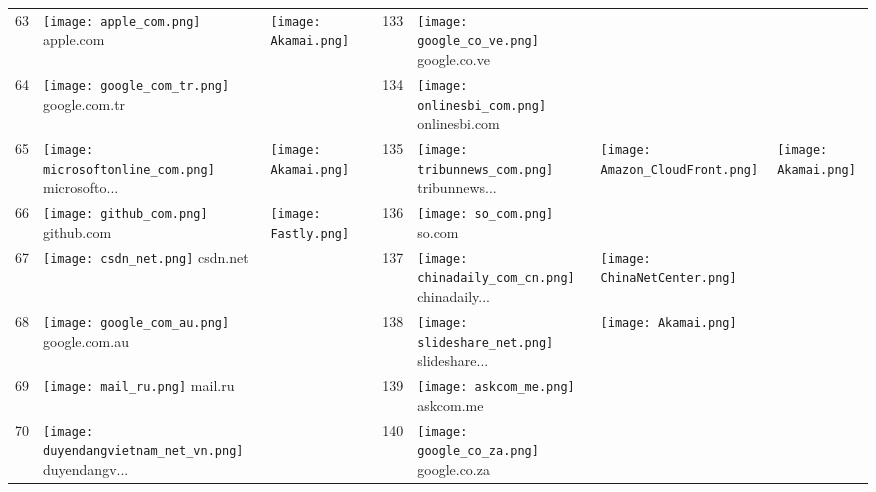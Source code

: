 \begin{table}[]
\begin{tabular}{|llll|llll|}
63 & \texttt{[image: apple\_com.png]} apple.com & \texttt{[image: Akamai.png]} & & 133 & \texttt{[image: google\_co\_ve.png]} google.co.ve & & \\
64 & \texttt{[image: google\_com\_tr.png]} google.com.tr & & & 134 & \texttt{[image: onlinesbi\_com.png]} onlinesbi.com & & \\
65 & \texttt{[image: microsoftonline\_com.png]} microsofto... & \texttt{[image: Akamai.png]} & & 135 & \texttt{[image: tribunnews\_com.png]} tribunnews... & \texttt{[image: Amazon\_CloudFront.png]} & \texttt{[image: Akamai.png]} \\
66 & \texttt{[image: github\_com.png]} github.com & \texttt{[image: Fastly.png]} & & 136 & \texttt{[image: so\_com.png]} so.com & & \\
67 & \texttt{[image: csdn\_net.png]} csdn.net & & & 137 & \texttt{[image: chinadaily\_com\_cn.png]} chinadaily... & \texttt{[image: ChinaNetCenter.png]} & \\
68 & \texttt{[image: google\_com\_au.png]} google.com.au & & & 138 & \texttt{[image: slideshare\_net.png]} slideshare... & \texttt{[image: Akamai.png]} & \\
69 & \texttt{[image: mail\_ru.png]} mail.ru & & & 139 & \texttt{[image: askcom\_me.png]} askcom.me & & \\
70 & \texttt{[image: duyendangvietnam\_net\_vn.png]} duyendangv... & & & 140 & \texttt{[image: google\_co\_za.png]} google.co.za & & \\
\hline
\end{tabular}
\end{table}

